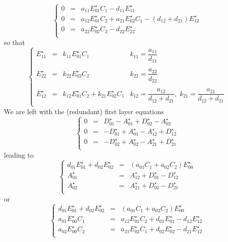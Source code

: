 \documentclass[aps,onecolumn,12pt]{revtex4}
\begin{document}
\begin{equation}
\left\lbrace
\begin{array}{rcl}
0 & = & a_{11} E_{01}^\star C_1 - d_{11} E_{11}^\star\\
0 & = & a_{12} E_{01}^\star C_2  + a_{21} E_{02}^\star C_1 - \left(d_{12}+d_{21}\right) E_{12}^\star\\
0 & = & a_{22} E_{02}^\star C_2 -d_{22} E_{22}^\star\\
\end{array}
\right.
\end{equation}
so that
\begin{equation}
\left\lbrace
\begin{array}{rcl|l}
	E_{11}^\star & = & k_{11} E_{01}^\star C_1 & k_{11} = \dfrac{a_{11}}{d_{11}}\\
	 & & & \\
	E_{22}^\star & = & k_{22} E_{02}^\star C_2 & k_{22} = \dfrac{a_{22}}{d_{22}}\\
	 & & & \\
	E_{12}^\star & = & k_{12} E_{01}^\star C_2 + k_{21} E_{02}^\star C_1  & k_{12} = \dfrac{a_{12}}{d_{12}+d_{21}},\; k_{21} = \dfrac{a_{21}}{d_{12}+d_{21}} \\
\end{array}
\right.
\end{equation}
We are left with the (redundant) first layer equations
\begin{equation}
\left\lbrace
\begin{array}{rcl}
0 & = & D_{01}^\star-A_{01}^\star + D_{02}^\star-A_{02}^\star\\
0 & = & -D_{01}^\star+A_{01}^\star  - A_{12}^\star + D_{12}^\star\\
0 & = & -D_{02}^\star+A_{02}^\star  - A_{21}^\star + D_{21}^\star\\
\end{array}
\right.
\end{equation}
leading to
\begin{equation}
\left\lbrace
\begin{array}{rcl}
d_{01}E_{01}^\star + d_{02} E_{02}^\star & = & \left( a_{01}C_1+a_{02}C_2\right)E_{00}^\star\\
A_{01}^\star & = & A_{12}^\star + D_{01}^\star - D_{12}^\star\\
A_{02}^\star & = & A_{21}^\star + D_{02}^\star - D_{21}^\star\\ 
\end{array}
\right.
\end{equation}
or
\begin{equation}
\left\lbrace
\begin{array}{rcl}
d_{01}E_{01}^\star + d_{02} E_{02}^\star & = & \left( a_{01}C_1+a_{02}C_2\right)E_{00}^\star\\
a_{01} E_{00}^\star C_1 & = & a_{12} E_{01}^\star C_2  + d_{01}E_{01}^\star - d_{12}E_{12}^\star\\
a_{02} E_{00}^\star C_2 & = & a_{21}E_{02}^\star C_1 + d_{02}E_{02}^\star - d_{21}E_{12}^\star\\ 
\end{array}
\right.
\end{equation}
\end{document}
